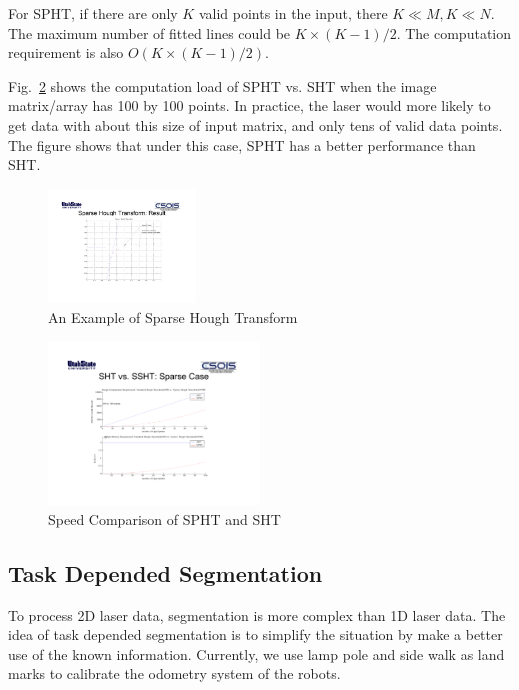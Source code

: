 \documentclass{cdcarta4}
\begin{document}
For SPHT, if there are only $K$ valid points in the input, there $K\ll M, K \ll N$. The maximum number of fitted lines could be $ K\times (K-1)/2$. The computation requirement is also $O(K\times (K-1)/2) $. 

Fig.~\ref{fig:sphtspeed} shows the computation load of SPHT vs. SHT when the image matrix/array has 100 by 100 points. In practice, the laser would more likely to get data with about this size of input matrix, and only tens of valid data points. The figure shows that under this case, SPHT has a better performance than SHT.


\begin{figure}
    \centering
    \includegraphics[angle=90,width=0.35\textwidth]{img/sparsehough}
    \caption{An Example of Sparse Hough Transform} \label{fig:spht}
\end{figure}

\begin{figure}
    \centering
    \includegraphics[angle=90,width=0.5\textwidth]{img/SSHTSpeed}
    \caption{Speed Comparison of SPHT and SHT} \label{fig:sphtspeed}
\end{figure}

    \subsection{Task Depended Segmentation}
To process 2D laser data, segmentation is more complex than 1D laser data. The idea of task depended segmentation is to simplify the situation by make a better use of the known information. Currently, we use lamp pole and side walk as land marks to calibrate the odometry system of the robots.
\end{document}
